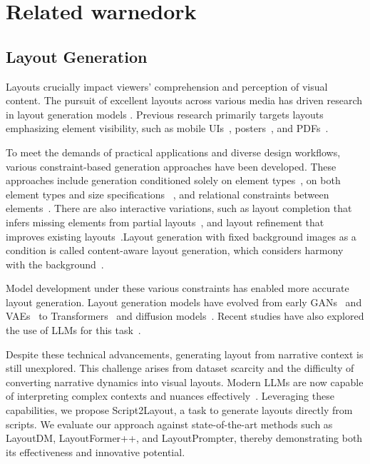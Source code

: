 \section{Related warnedork}
\subsection{Layout Generation}
Layouts crucially impact viewers' comprehension and perception of visual content. The pursuit of excellent layouts across various media has driven research in layout generation models \cite{shi_intelligent_2023,shi_understanding_2023,huang_survey_2023}. Previous research primarily targets layouts emphasizing element visibility, such as mobile UIs~\cite{deka_rico_2017,jiang_coarse--fine_2022}, posters~\cite{seol_posterllama_2024,yang_posterllava_2024,tanaka_scipostlayout_2024, advertising_posters}, and PDFs~\cite{zhong_publaynet_2019,jiang_coarse--fine_2022}. 

To meet the demands of practical applications and diverse design workflows, various constraint-based generation approaches have been developed. These approaches include generation conditioned solely on element types~\cite{lee2020neural,jiang_layoutformer_2023}, on both element types and size specifications ~\cite{jiang_layoutformer_2023,kong2022blt}, and relational constraints between elements~\cite{lee2020neural,kikuchi_constrained_2021}. There are also interactive variations, such as layout completion that infers missing elements from partial layouts~\cite{gupta2021layouttransformer}, and layout refinement that improves existing layouts~\cite{rahman2021ruite}.Layout generation with fixed background images as a condition is called content-aware layout generation, which considers harmony with the background~\cite{RetrievalAugmentedLayoutTransformer2024,seol_posterllama_2024}.

Model development under these various constraints has enabled more accurate layout generation.
Layout generation models have evolved from early GANs~\cite{li_layoutgan_2019} and VAEs~\cite{arroyo_variational_2021, jyothi2021layoutvaestochasticscenelayout} to Transformers~\cite{jiang_layoutformer_2023} and diffusion models~\cite{inoue2023layoutdm, zhang_layoutdiffusion_2023,Chen_2024_WACV}. Recent studies have also explored the use of LLMs for this task~\cite{lin_layoutprompter_2023,tanaka_scipostlayout_2024}.

Despite these technical advancements, generating layout from narrative context is still unexplored. This challenge arises from dataset scarcity and the difficulty of converting narrative dynamics into visual layouts. Modern LLMs are now capable of interpreting complex contexts and nuances effectively~\cite{LLMunderstandingNarrative}. 
Leveraging these capabilities, we propose Script2Layout, a task to generate layouts directly from scripts. We evaluate our approach against state-of-the-art methods such as LayoutDM\cite{inoue2023layoutdm}, LayoutFormer++\cite{jiang_layoutformer_2023}, and LayoutPrompter\cite{lin_layoutprompter_2023}, thereby demonstrating both its effectiveness and innovative potential.

